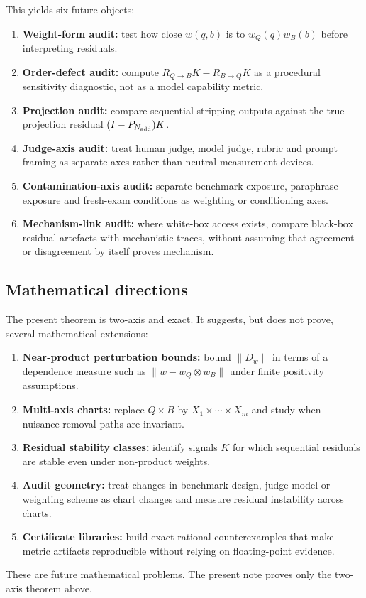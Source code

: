 \documentclass[11pt]{article}
\theoremstyle{remark}
\newcommand{\RQBt}{R_{Q\to B}}
\newcommand{\RBQt}{R_{B\to Q}}
\begin{document}
This yields six future objects:
\begin{enumerate}[leftmargin=*,itemsep=2pt]
\item \textbf{Weight-form audit:} test how close $w(q,b)$ is to $w_Q(q)w_B(b)$ before interpreting residuals.
\item \textbf{Order-defect audit:} compute $\RQBt K-\RBQt K$ as a procedural sensitivity diagnostic, not as a model capability metric.
\item \textbf{Projection audit:} compare sequential stripping outputs against the true projection residual $(I-P_{N_{\rm add}})K$.
\item \textbf{Judge-axis audit:} treat human judge, model judge, rubric and prompt framing as separate axes rather than neutral measurement devices.
\item \textbf{Contamination-axis audit:} separate benchmark exposure, paraphrase exposure and fresh-exam conditions as weighting or conditioning axes.
\item \textbf{Mechanism-link audit:} where white-box access exists, compare black-box residual artefacts with mechanistic traces, without assuming that agreement or disagreement by itself proves mechanism.
\end{enumerate}

\subsection{Mathematical directions}

The present theorem is two-axis and exact. It suggests, but does not prove, several mathematical extensions:
\begin{enumerate}[leftmargin=*,itemsep=2pt]
\item \textbf{Near-product perturbation bounds:} bound $\|D_w\|$ in terms of a dependence measure such as $\|w-w_Q\otimes w_B\|$ under finite positivity assumptions.
\item \textbf{Multi-axis charts:} replace $Q\times B$ by $X_1\times\cdots\times X_m$ and study when nuisance-removal paths are invariant.
\item \textbf{Residual stability classes:} identify signals $K$ for which sequential residuals are stable even under non-product weights.
\item \textbf{Audit geometry:} treat changes in benchmark design, judge model or weighting scheme as chart changes and measure residual instability across charts.
\item \textbf{Certificate libraries:} build exact rational counterexamples that make metric artifacts reproducible without relying on floating-point evidence.
\end{enumerate}
These are future mathematical problems. The present note proves only the two-axis theorem above.
\end{document}

